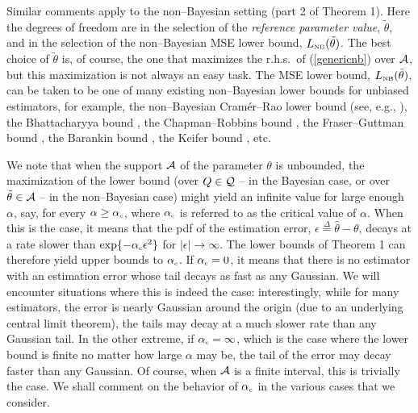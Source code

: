 \documentclass[11pt,epsf]{article}
\newcommand {\dfn} {\stackrel{\Delta} {=}}
\newcommand{\ttt}{\tilde{\theta}}
\newcommand{\ct}{\hat{\theta}}
\newcommand{\calA}{{\cal A}}
\newcommand{\calQ}{{\cal Q}}
\begin{document}
Similar comments apply
to the non--Bayesian setting (part 2 of Theorem 1). Here the degrees of
freedom are in the
selection of the {\it reference parameter value}, $\ttt$, and in the selection
of the non--Bayesian MSE lower bound, $L_{\mbox{\tiny NB}}(\ttt)$. 
The best choice of $\ttt$ is, of course, the one that maximizes the r.h.s.\ of
(\ref{genericnb}) over $\calA$, but this maximization is not always an easy
task. The MSE lower bound, $L_{\mbox{\tiny NB}}(\ttt)$, can
be taken to be one of many existing non--Bayesian lower bounds for unbiased
estimators, for example,
the non--Bayesian Cram\'er--Rao lower bound (see, e.g.,
\cite{vantrees}), the Bhattacharyya bound \cite{bhattacharyya46}, the
Chapman--Robbins bound
\cite{CR51}, the Fraser--Guttman bound \cite{FG52},
the Barankin bound \cite{Barankin49}, the Keifer bound \cite{Keifer52}, etc.

We note that when the support $\calA$ of the parameter $\theta$ is unbounded, 
the maximization of the lower bound (over $Q\in\calQ$ -- in the Bayesian
case, or over $\ttt\in\calA$ -- in the non--Bayesian case) might yield an
infinite value for large enough $\alpha$, say,
for every $\alpha\ge\alpha_{\mbox{\tiny c}}$, where 
$\alpha_{\mbox{\tiny c}}$ is referred to as the critical value of $\alpha$.
When this is
the case, it means that the pdf of the estimation
error, $\epsilon\dfn\ct-\theta$, decays at a rate slower than
$\exp\{-\alpha_{\mbox{\tiny c}}\epsilon^2\}$ for $|\epsilon|\to\infty$.
The lower bounds of Theorem 1 can therefore yield upper bounds to
$\alpha_{\mbox{\tiny c}}$. If $\alpha_{\mbox{\tiny c}}=0$,
it means that there is no estimator with an estimation error whose tail decays
as fast as any Gaussian. We will encounter situations where this is indeed the
case: interestingly, while for many estimators, the error is nearly Gaussian around the
origin (due to an underlying central limit theorem), the tails may decay at a much
slower rate than any Gaussian tail. In the other extreme,
if $\alpha_{\mbox{\tiny c}}=\infty$, which is
the case where the lower bound is finite no matter how large $\alpha$ may be,
the tail of the error may decay faster than any Gaussian. Of course, when
$\calA$ is a finite interval, this is trivially the case. We shall comment on the
behavior of $\alpha_{\mbox{\tiny c}}$ in the various cases that we
consider.
\end{document}
